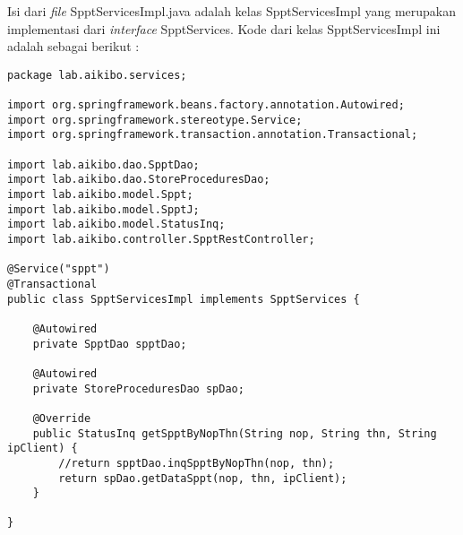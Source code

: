 \documentclass[pdftex,12pt, oneside]{article}
\begin{document}
Isi dari \textit{file} SpptServicesImpl.java adalah kelas SpptServicesImpl yang merupakan implementasi dari \textit{interface} SpptServices. Kode dari kelas SpptServicesImpl ini adalah sebagai berikut :

\begin{lstlisting}
package lab.aikibo.services;

import org.springframework.beans.factory.annotation.Autowired;
import org.springframework.stereotype.Service;
import org.springframework.transaction.annotation.Transactional;

import lab.aikibo.dao.SpptDao;
import lab.aikibo.dao.StoreProceduresDao;
import lab.aikibo.model.Sppt;
import lab.aikibo.model.SpptJ;
import lab.aikibo.model.StatusInq;
import lab.aikibo.controller.SpptRestController;

@Service("sppt")
@Transactional
public class SpptServicesImpl implements SpptServices {

	@Autowired
	private SpptDao spptDao;

	@Autowired
	private StoreProceduresDao spDao;

	@Override
	public StatusInq getSpptByNopThn(String nop, String thn, String ipClient) {
		//return spptDao.inqSpptByNopThn(nop, thn);
		return spDao.getDataSppt(nop, thn, ipClient);
	}

}
\end{lstlisting}
\end{document}
